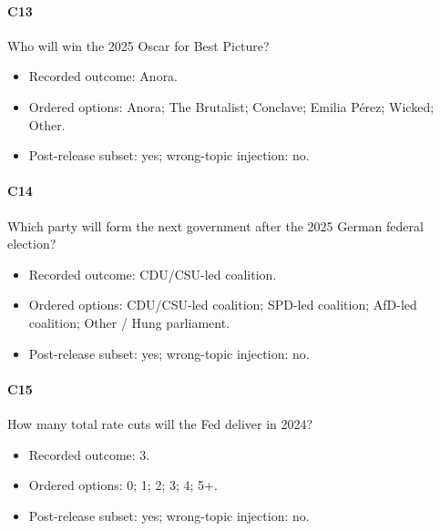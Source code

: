 \paragraph*{C13} Who will win the 2025 Oscar for Best Picture?

\begin{itemize}

\item Recorded outcome: Anora.

\item Ordered options: Anora; The Brutalist; Conclave; Emilia Pérez; Wicked; Other.

\item Post-release subset: yes; wrong-topic injection: no.

\end{itemize}

\paragraph*{C14} Which party will form the next government after the 2025 German federal election?

\begin{itemize}

\item Recorded outcome: CDU/CSU-led coalition.

\item Ordered options: CDU/CSU-led coalition; SPD-led coalition; AfD-led coalition; Other / Hung parliament.

\item Post-release subset: yes; wrong-topic injection: no.

\end{itemize}

\paragraph*{C15} How many total rate cuts will the Fed deliver in 2024?

\begin{itemize}

\item Recorded outcome: 3.

\item Ordered options: 0; 1; 2; 3; 4; 5+.

\item Post-release subset: yes; wrong-topic injection: no.

\end{itemize}

